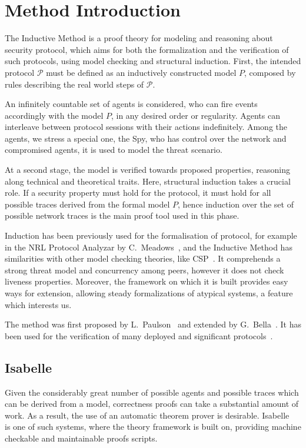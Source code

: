 \section{Method Introduction}\label{sec:inductive-method}
The Inductive Method is a proof theory for modeling and reasoning about security protocol, which aims for both the formalization and the verification of such protocols, using model checking and structural induction. First, the intended protocol \(\mathcal{P}\) must be defined as an inductively constructed model \(P\), composed by rules describing the real world steps of \(\mathcal{P}\).

An infinitely countable set of agents is considered, who can fire events accordingly with the model \(P\), in any desired order or regularity. Agents can interleave between protocol sessions with their actions indefinitely. Among the agents, we stress a special one, the Spy, who has control over the network and compromised agents, it is used to model the threat scenario.

At a second stage, the model is verified towards proposed properties, reasoning along technical and theoretical traits. Here, structural induction takes a crucial role. If a security property must hold for the protocol, it must hold for all possible traces derived from the formal model \(P\), hence induction over the set of possible network traces is the main proof tool used in this phase.

Induction has been previously used for the formalisation of protocol, for example in the NRL Protocol Analyzar by C.~Meadows~\cite{Meadows96}, and the Inductive Method has similarities with other model checking theories, like CSP~\cite{RyanSchneider2010}. It comprehends a strong threat model and concurrency among peers, however it does not check liveness properties. Moreover, the framework on which it is built provides easy ways for extension, allowing steady formalizations of atypical systems, a feature which interests us.

The method was first proposed by L.~Paulson~\cite{Paulson98} and extended by G.~Bella~\cite{Bella2007}. It has been used for the verification of many deployed and significant protocols~\cite{Paulson99, BellaPaulson2006, Bella2003}.



\subsection{Isabelle}
Given the considerably great number of possible agents and possible traces which can be derived from a model, correctness proofs can take a substantial amount of work. As a result, the use of an automatic theorem prover is desirable. Isabelle~\cite{isabelle} is one of such systems, where the theory framework is built on, providing machine checkable and maintainable proofs scripts.

